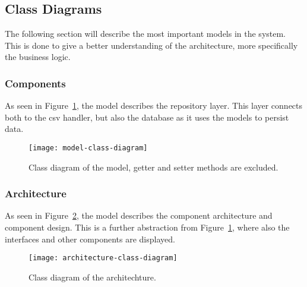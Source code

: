 \subsection{Class Diagrams}\label{subsec:class-diagrams}

The following section will describe the most important models in the system.
This is done to give a better understanding of the architecture, more specifically the business logic.

\subsubsection{Components}

As seen in Figure~\ref{fig:model-class-diagram}, the model describes the repository layer.
This layer connects both to the csv handler, but also the database as it uses the models to persist data.

\begin{figure}[H]
    \centering
    \texttt{[image: model-class-diagram]}
    \caption{Class diagram of the model, getter and setter methods are excluded.
    }\label{fig:model-class-diagram}
\end{figure}

\subsubsection{Architecture}

As seen in Figure~\ref{fig:architechture-class-diagram}, the model describes the component architecture and component
design.
This is a further abstraction from Figure~\ref{fig:model-class-diagram}, where also the interfaces and other components
are displayed.

\begin{figure}[H]
    \centering
    \texttt{[image: architecture-class-diagram]}
    \caption{Class diagram of the architechture.
    }\label{fig:architechture-class-diagram}
\end{figure}
